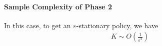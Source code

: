 \documentclass{article}
\newtheorem{corollary}{Corollary}[section]
\numberwithin{equation}{section}
\begin{document}
\paragraph{Sample Complexity of Phase 2} In this case, to get an $\varepsilon$-stationary policy, we have
\begin{align*}
    K\sim O(\frac{1}{\varepsilon^2})
\end{align*}

\end{document}
